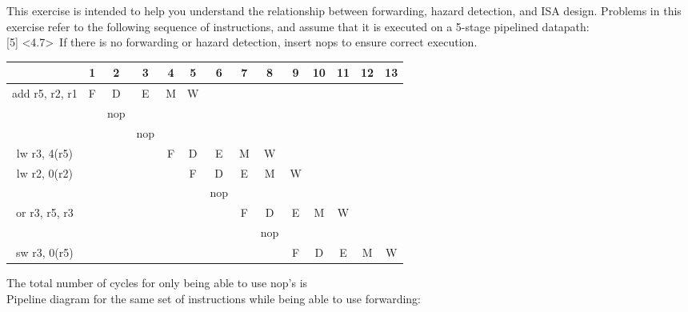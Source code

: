 \documentclass[12pt]{article}
\begin{document}
	
	\noindent {} 
	This exercise is intended to help you understand the relationship between forwarding, hazard detection, and ISA design. Problems in this exercise refer to the following sequence of instructions, and assume that it is executed on a 5-stage pipelined datapath: \vspace{0.3cm} \\
	
	
	\noindent {} 
	[5] \textless4.7\textgreater \ If there is no forwarding or hazard detection, insert nops to ensure correct execution. \\
	
	\begin{center}
		\begin{tabular}{ |c|c|c|c|c|c|c|c|c|c|c|c|c|c| } 
			\hline
			& 1 & 2 & 3 & 4 & 5 & 6 & 7 & 8 & 9 & 10 & 11 & 12 & 13 \\
			\hline
			add r5, r2, r1 & F & D & E & M & W &  &  &  &  &  &  &  &   \\
			\hline
			&  & nop &  &  &  &  &  &  &  &  &  &  &   \\
			\hline
			&  &  & nop &  &  &  &  &  &  &  &  &  &   \\
			\hline
			lw r3, 4(r5) &  &  &  & F & D & E & M & W &  &  &  &  &   \\
			\hline
			lw r2, 0(r2) &  &  &  &  & F & D & E & M & W &  &  &  &   \\
			\hline
			&  &  &  &  &  & nop &  &  &  &  &  &  &   \\
			\hline
			or r3, r5, r3 &  &  &  &  &  &  & F & D & E & M & W &  &   \\
			\hline
			&  &  &  &  &  &  &  & nop &  &  &  &  &   \\
			\hline
			sw r3, 0(r5) &  &  &  &  &  &  &  &  & F & D & E & M & W  \\
			\hline
			
		\end{tabular}
	\end{center}
	
	\vspace{0.2cm}
	
	The total number of cycles for only being able to use nop's is  \vspace{0.4cm} \\
	
	\noindent Pipeline diagram for the same set of instructions while being able to use forwarding:  \\
	
\end{document}
